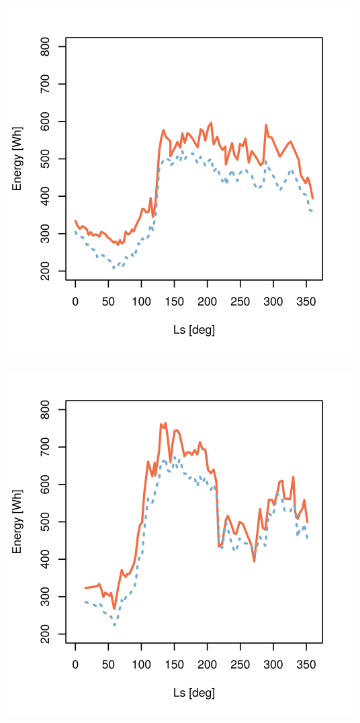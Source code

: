 \begin{figure}[h]
\begin{subfigure}[t]{\subfigureWidth}
		\label{fig:plot:sub:mer-energy-production-predicted-vs-reported-my29-adjusted}
	\end{subfigure}\hfill
	\begin{subfigure}[t]{\subfigureWidth}
        \centering
		\includegraphics[height=\graphicsHeight]{sections/appendix/energy-error-margin/plots/predicted-vs-measured-energy-my30-adjusted.png}
		\label{fig:plot:sub:mer-energy-production-predicted-vs-reported-my30-adjusted}
	\end{subfigure}\hfill
    \begin{subfigure}[t]{\subfigureWidth}
        \centering
		\includegraphics[height=\graphicsHeight]{sections/appendix/energy-error-margin/plots/predicted-vs-measured-energy-my32-adjusted.png}

\end{subfigure}
\end{figure}
